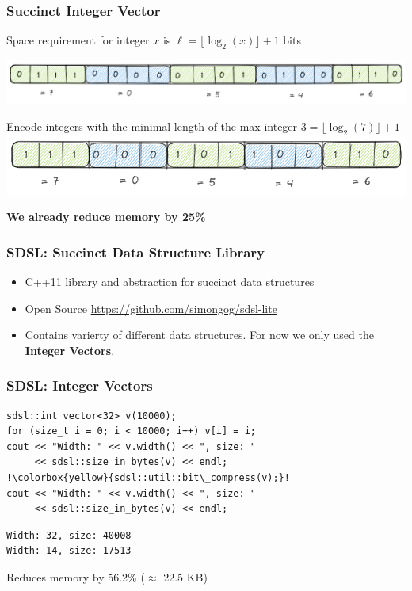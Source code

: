 \documentclass{beamer}
\begin{document}
\begin{frame}
    \frametitle{Succinct Integer Vector}
    \centering
    Space requirement for integer $x$ is $\ell = \lfloor \log_2(x) \rfloor + 1$ bits

    \includegraphics[width=\framewidth]{figures/excalidraw/bit-int-vector.png}
    \pause

    Encode integers with the minimal length of the max integer $3 = \lfloor \log_2(7) \rfloor + 1$ \\
    \vspace{0.5cm} 
    \includegraphics[width=0.75\framewidth]{figures/excalidraw/bit-compressed-int-vector.png}

    \vspace{0.5cm}
    \textbf{We already reduce memory by 25\%}
\end{frame}


\begin{frame}
    \frametitle{SDSL: Succinct Data Structure Library}

    \begin{itemize}
        \item C++11 library and abstraction for succinct data structures
        \item Open Source \url{https://github.com/simongog/sdsl-lite}
        \item Contains varierty of different data structures. For now we only used the \textbf{Integer Vectors}.
    \end{itemize}
\end{frame}


\begin{frame}[fragile]
    \frametitle{SDSL: Integer Vectors}

\begin{lstlisting}[style=C++,escapechar=!]
sdsl::int_vector<32> v(10000);
for (size_t i = 0; i < 10000; i++) v[i] = i;
cout << "Width: " << v.width() << ", size: " 
     << sdsl::size_in_bytes(v) << endl;
!\colorbox{yellow}{sdsl::util::bit\_compress(v);}!
cout << "Width: " << v.width() << ", size: " 
     << sdsl::size_in_bytes(v) << endl;
\end{lstlisting}

\pause

\begin{lstlisting}[style=shell]
Width: 32, size: 40008
Width: 14, size: 17513
\end{lstlisting}

\pause

\begin{center}
    Reduces memory by 56.2\% ($\approx$ 22.5 KB)
\end{center}
\end{frame}
\end{document}
